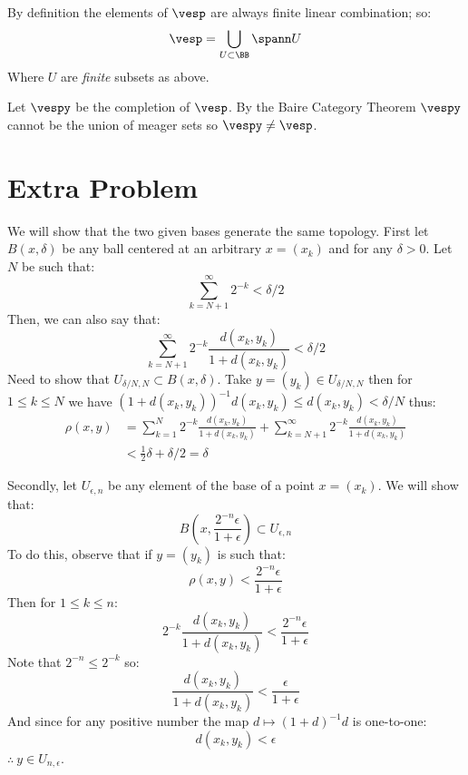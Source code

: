 By definition the elements of $\vesp$ are always finite linear combination; so:
$$\vesp = \bigcup_{U\subset \BB} \spann U$$ 
Where $U$ are \emph{finite} subsets as above. 

Let $\vespy$ be the completion of $\vesp$. 
By the Baire Category Theorem $\vespy$ cannot be the union of meager sets so $\vespy\neq \vesp$.

\section*{Extra Problem}
We will show that the two given bases generate the same topology.
First let $B(x,\delta)$ be any ball centered at an arbitrary $x=(x_k)$ and for any $\delta>0$. 
Let $N$ be such that:
$$\sum_{k=N+1}^\infty 2^{-k} < \delta/2$$
Then, we can also say that:
$$\sum_{k=N+1}^\infty 2^{-k} \frac{d(x_k,y_k)}{1+d(x_k,y_k)}< \delta/2$$
Need to show that $U_{\delta/N,N}\subset B(x,\delta)$.
Take $y=(y_k) \in U_{\delta/N,N}$ then for $1\leq k \leq N$ we have $(1+d(x_k,y_k))^{-1}d(x_k,y_k)\leq d(x_k,y_k) < \delta/N$ thus:
\begin{align*}
\rho(x,y) &= \sum_{k=1}^N 2^{-k} \frac{d(x_k,y_k)}{1+d(x_k,y_k)} + \sum_{k=N+1}^\infty 2^{-k} \frac{d(x_k,y_k)}{1+d(x_k,y_k)} \\
          &< \frac 12 \delta + \delta/2 = \delta
\end{align*}

Secondly, let $U_{\epsilon, n}$ be any element of the base of a point $x=(x_k)$. We will show that:
$$B\left(x,\frac{2^{-n}\epsilon}{1+\epsilon}\right) \subset U_{\epsilon, n}$$
To do this, observe that if $y=(y_k)$ is such that:
$$\rho(x,y)<\frac{2^{-n}\epsilon}{1+\epsilon}$$
Then for $1\leq k \leq n$:
$$2^{-k} \frac{d(x_k,y_k)}{1+d(x_k,y_k)} < \frac{2^{-n}\epsilon}{1+\epsilon}$$
Note that $2^{-n}\leq 2^{-k}$ so:
$$ \frac{d(x_k,y_k)}{1+d(x_k,y_k)} < \frac{\epsilon}{1+\epsilon}$$
And since for any positive number the map $d\mapsto (1+d)^{-1}d$ is one-to-one:
$$d(x_k,y_k)<\epsilon$$
$\therefore \ y\in U_{n,\epsilon}$.
